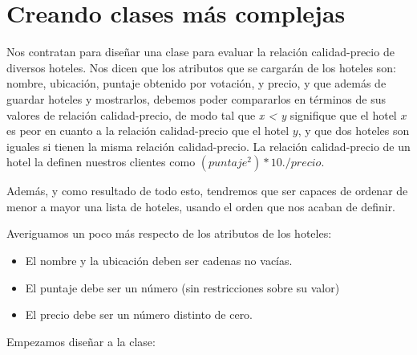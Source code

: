 \section{Creando clases más complejas}

Nos contratan para diseñar una clase para evaluar la relación calidad-precio de
diversos hoteles.  Nos dicen que los atributos que se cargarán de los hoteles
son: nombre, ubicación, puntaje obtenido por votación, y precio, y que además
de guardar hoteles y mostrarlos, debemos poder compararlos en términos de
sus valores de relación calidad-precio, de modo tal que {\it x < y} signifique
que el hotel $x$ es peor en cuanto a la relación calidad-precio que el hotel
$y$, y que dos hoteles son iguales si tienen la misma relación calidad-precio.
La relación calidad-precio de un hotel la definen nuestros clientes como
$(puntaje^2)*10./precio$.

Además, y como resultado de todo esto, tendremos que ser capaces
de ordenar de menor a mayor una lista de hoteles, usando el orden que nos
acaban de definir.

Averiguamos un poco más respecto de los atributos de los hoteles:

\begin{itemize}
\item El nombre y la ubicación deben ser cadenas no vacías.
\item El puntaje debe ser un número (sin restricciones sobre su valor)
\item El precio debe ser un número distinto de cero.
\end{itemize}

Empezamos diseñar a la clase:


